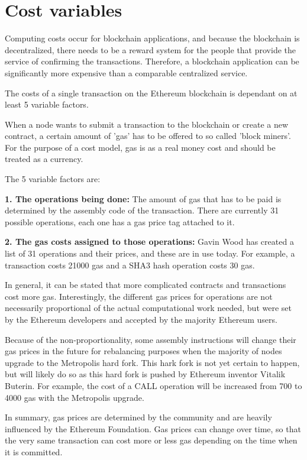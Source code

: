 \section{Cost variables}
Computing costs occur for blockchain applications, and because the blockchain is decentralized, there needs to be a reward system for the people that provide the service of confirming the transactions.
Therefore, a blockchain application can be significantly more expensive than a comparable centralized service.

The costs of a single transaction on the Ethereum blockchain is dependant on at least 5 variable factors. 

When a node wants to submit a transaction to the blockchain or create a new contract, a certain amount of {'}gas{'} has to be offered to so called {'}block miners{'}. For the purpose of a cost model, gas is as a real money cost and should be treated as a currency.

The 5 variable factors are:

\textbf{1. The operations being done:} The amount of gas that has to be paid is determined by the assembly code of the transaction. There are currently 31 possible operations, each one has a gas price tag attached to it.

\par
\textbf{2. The gas costs assigned to those operations:} Gavin Wood has created a list of 31 operations and their prices, and these are in use today. For example, a transaction costs 21000 gas and a SHA3 hash operation costs 30 gas.

In general, it can be stated that more complicated contracts and transactions cost more gas. Interestingly, the different gas prices for operations are not necessarily proportional of the actual computational work needed, but were set by the Ethereum developers and accepted by the majority Ethereum users.

Because of the non-proportionality, some assembly instructions will change their gas prices in the future for rebalancing purposes when the majority of nodes upgrade to the Metropolis hard fork. This hark fork is not yet certain to happen, but will likely do so as this hard fork is pushed by Ethereum inventor Vitalik Buterin. For example, the cost of a CALL operation will be increased from 700 to 4000 gas with the Metropolis upgrade.

In summary, gas prices are determined by the community and are heavily influenced by the Ethereum Foundation. Gas prices can change over time, so that the very same transaction can cost more or less gas depending on the time when it is committed.

